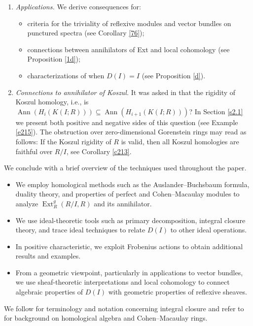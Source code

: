 \documentclass[11pt,a4paper]{amsart}
\numberwithin{equation}{section}
\DeclareMathOperator{\Ann}{Ann}\DeclareMathOperator{\ann}{Ann}
\DeclareMathOperator{\Ext}{Ext}
\begin{document}
\begin{enumerate}
	\item[(v)] \emph{Applications.}  
	We derive consequences for:
	\begin{itemize}
		\item[(a)] criteria for the triviality of reflexive modules and vector bundles on punctured spectra (see Corollary \ref{76});
		\item[(b)] connections between annihilators of Ext and local cohomology (see Proposition \ref{1d});
		\item[(c)] characterizations of when \(D(I) = I\) (see Proposition \ref{d}).
	\end{itemize}

\item[(vi)] \emph{Connections to annihilator of Koszul.} 
It was asked in \cite[\S 1]{corso} that the rigidity of Koszul homology, i.e., is $\Ann(H_i(K(I;  R)))\subseteq\Ann(H_{i+1}(K(I;  R)))$? In Section \ref{s2.1}   we present both positive and negative sides of this question (see {Example} \ref{e215}).
The obstruction over zero-dimensional Gorenstein rings may read as follows: If the  Koszul rigidity of $R$ is valid, then   all Koszul homologies are faithful over $R/I$, see Corollary \ref{c213}.
\end{enumerate}

We conclude with a brief overview of the techniques used throughout the paper.

\begin{itemize}
	\item We employ homological methods such as the Auslander–Buchsbaum formula, duality theory, and properties of perfect and Cohen–Macaulay modules to analyze \(\Ext^g_R(R/I,R)\) and its annihilator.
	
	\item We use ideal-theoretic tools such as primary decomposition, integral closure theory, and trace ideal techniques to relate \(D(I)\) to other ideal operations.
	
	\item In positive characteristic, we exploit Frobenius actions to obtain additional results and examples.
	
	\item From a geometric viewpoint, particularly in applications to vector bundles, we use sheaf-theoretic interpretations and local cohomology to connect algebraic properties of \(D(I)\) with geometric properties of reflexive sheaves.
\end{itemize}

We follow \cite{HS} for terminology and notation concerning integral closure and refer to \cite{BH} for background on homological algebra and Cohen–Macaulay rings.
\end{document}

